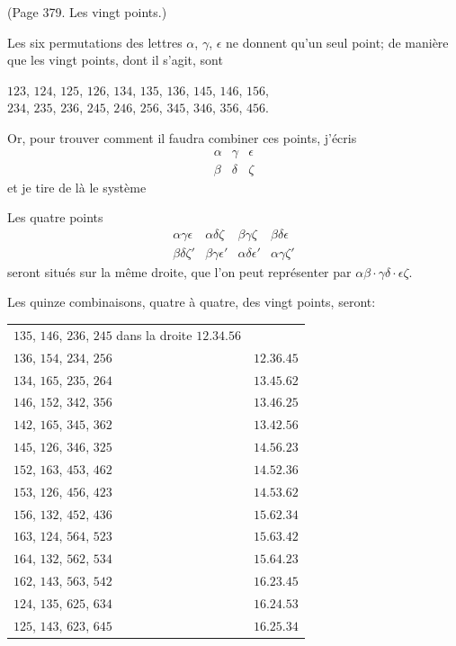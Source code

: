 \documentclass[11pt,a4paper]{article}
\theoremstyle{plain}
\theoremstyle{definition}
\begin{document}
(Page 379. Les vingt points.)

Les six permutations des lettres $\alpha$, $\gamma$, $\epsilon$ ne donnent qu'un seul point;
de mani\`{e}re que les vingt points, dont il s'agit, sont
\begin{center}
$123$, $124$, $125$, $126$, $134$, $135$, $136$, $145$, $146$, $156$, \\
$234$, $235$, $236$, $245$, $246$, $256$, $345$, $346$, $356$, $456$.
\end{center}

Or, pour trouver comment il faudra combiner ces points, j'\'{e}cris
\[
\begin{array}{ccc}
\alpha & \gamma & \epsilon \\
\beta & \delta & \zeta
\end{array}
\]
et je tire de l\`{a} le syst\`{e}me

Les quatre points
\[
\begin{array}{cccc}
\alpha\gamma\epsilon & \alpha\delta\zeta & \beta\gamma\zeta & \beta\delta\epsilon \\
\beta\delta\zeta' & \beta\gamma\epsilon' & \alpha\delta\epsilon' & \alpha\gamma\zeta'
\end{array}
\]
seront situ\'{e}s sur la m\^{e}me droite, que l'on peut repr\'{e}senter par
$\alpha\beta \cdot \gamma\delta \cdot \epsilon\zeta$.

Les quinze combinaisons, quatre \`{a} quatre, des vingt points, seront:
\begin{center}
\begin{tabular}{ll}
$135$, $146$, $236$, $245$ dans la droite $12.34.56$ \\
$136$, $154$, $234$, $256$ & $12.36.45$ \\
$134$, $165$, $235$, $264$ & $13.45.62$ \\
$146$, $152$, $342$, $356$ & $13.46.25$ \\
$142$, $165$, $345$, $362$ & $13.42.56$ \\
$145$, $126$, $346$, $325$ & $14.56.23$ \\
$152$, $163$, $453$, $462$ & $14.52.36$ \\
$153$, $126$, $456$, $423$ & $14.53.62$ \\
$156$, $132$, $452$, $436$ & $15.62.34$ \\
$163$, $124$, $564$, $523$ & $15.63.42$ \\
$164$, $132$, $562$, $534$ & $15.64.23$ \\
$162$, $143$, $563$, $542$ & $16.23.45$ \\
$124$, $135$, $625$, $634$ & $16.24.53$ \\
$125$, $143$, $623$, $645$ & $16.25.34$
\end{tabular}
\end{center}
\end{document}
